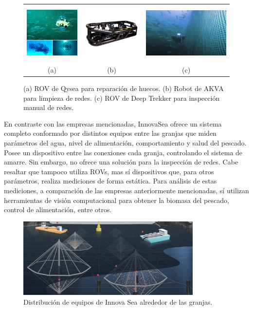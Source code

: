 \begin{figure} [!h]
    \begin{center}
    \begin{tabular}{ccc}
    \includegraphics[height=3cm]{images/Qysea_1} &
    \includegraphics[height=2cm]{images/AKVA_1} &
    \includegraphics[height=3cm]{images/Deep_1} \\
    (a) & (b) & (c)
    \end{tabular}
    \caption{\label{fig:empresas_manual}(a) ROV de Qysea para reparación de huecos. (b) Robot de AKVA para limpieza de redes. (c) ROV de Deep Trekker para inspección manual de redes.}
    \end{center}
\end{figure}


En contraste con las empresas mencionadas, InnovaSea \cite{InnovaSea} ofrece un sistema completo conformado por distintos equipos entre las granjas que miden parámetros del agua, nivel de alimentación, comportamiento y salud del pescado. Posee un dispositivo entre las conexiones cada granja, controlando el sistema de amarre. Sin embargo, no ofrece una solución para la inspección de redes. Cabe resaltar que tampoco utiliza ROVs, mas sí dispositivos que, para otros parámetros, realiza mediciones de forma estática. Para análisis de estas mediciones, a comparación de las empresas anteriormente mencionadas, sí utilizan herramientas de visión computacional para obtener la biomasa del pescado, control de alimentación, entre otros. 

\begin{figure} [!h]
    \begin{center}
    \includegraphics[height=4cm]{images/InnovaSea_1} 
    \caption{\label{fig:InnovaSea_sistema}Distribución de equipos de Innova Sea alrededor de las granjas.}
    \end{center}
\end{figure}



